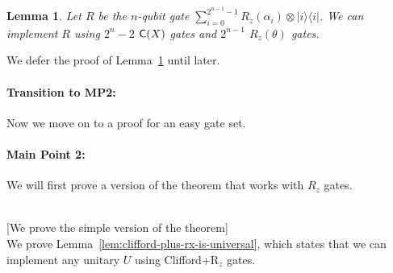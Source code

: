 \documentclass[11pt]{article}
\newtheorem{lemma}[theorem]{Lemma}
\def\ket#1{|#1\rangle}
\def\bra#1{\langle#1|}
\def\outer#1#2{\ket{#1}\bra{#2}}
\def\C#1{\text{\sf C}{(#1)}}
\begin{document}
\begin{lemma}
Let $R$ be the $n$-qubit gate 
$\sum_{i=0}^{2^{n-1}-1} R_z(\alpha_i) \otimes \outer{i}{i}$.
We can implement $R$ using 
$2^n - 2$ $\C{X}$ gates and 
$2^{n-1}$ $R_z(\theta)$ gates.
\label{rzcount}
\end{lemma}

We defer the proof of Lemma~\ref{rzcount} until later.

\paragraph{Transition to MP2:}
Now we move on to a proof for an easy gate set.

\newpage

\paragraph{Main Point 2:}
We will first prove a version of the theorem that works with $R_z$ gates. 

\mbox{} \\ \hspace*{1cm}
   [We prove the simple version of the theorem] \\
We prove Lemma~\ref{lem:clifford-plus-rx-is-universal},
which states that we can implement any unitary $U$ using Clifford+R$_z$ gates.
\end{document}
